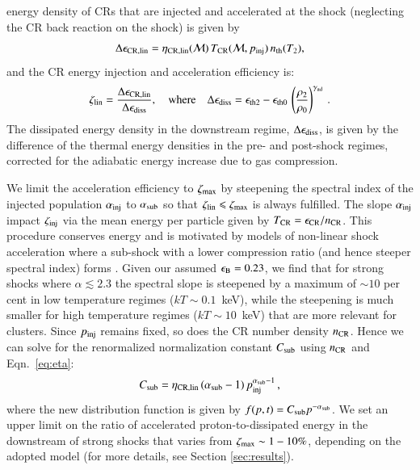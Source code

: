 \documentclass[fleqn,usenatbib,useAMS]{mnras}
\newcommand\eb{\epsilon_\rmn{B}}
\begin{document}
energy density of CRs that are injected and accelerated at the shock
(neglecting the CR back reaction on the shock) is given by
\begin{equation}
\label{eq:CR_energy} 
  \Delta\epsilon_{\mathrm{CR,lin}} =
  \eta_{\mathrm{CR,lin}}(\mathcal{M})\,T_{\mathrm{CR}}(\mathcal{M},p_{\mathrm{inj}})\,n_{\mathrm{th}}(T_2),
\end{equation}
and the CR energy injection and acceleration efficiency is:
\begin{equation}
  \zeta_{\mathrm{lin}} =
  \frac{\Delta\epsilon_{\mathrm{CR,lin}}}{\Delta\epsilon_{\mathrm{diss}}},
   \quad\mbox{where}\quad
  \Delta\epsilon_{\mathrm{diss}} = \epsilon_{\mathrm{th2}} - \epsilon_{\mathrm{th0}}\,\left(\frac{\rho_2}{\rho_0}\right)^{\gamma_{\mathrm{ad}}}\,.
\label{eqn:energy_frac}  
\end{equation}
The dissipated energy density in the downstream regime,
$\Delta\epsilon_{\mathrm{diss}}$, is given by the difference of the thermal
energy densities in the pre- and post-shock regimes, corrected for the
adiabatic energy increase due to gas compression.

We limit the acceleration efficiency to $\zeta_{\mathrm{max}}$ by
steepening the spectral index of the injected population
$\alpha_{\mathrm{inj}}$ to $\alpha_{\mathrm{sub}}$ so that $\zeta_{\mathrm{lin}}
\leqslant \zeta_{\mathrm{max}}$ is always fulfilled. The slope
$\alpha_{\mathrm{inj}}$ impact $\zeta_{\mathrm{inj}}$ via the mean energy per
particle given by $T_{\mathrm{CR}} = \epsilon_{\mathrm{CR}}/n_{\mathrm{CR}}$. This
procedure conserves energy and is motivated by models of non-linear
shock acceleration where a sub-shock with a lower compression ratio
(and hence steeper spectral index) forms
\citep[e.g.,][]{2000ApJ...540..292E}. Given our assumed $\eb=0.23$, we
find that for strong shocks where $\alpha \lesssim 2.3$ the spectral
slope is steepened by a maximum of $\sim 10$ per cent in low
temperature regimes ($kT\sim 0.1$~keV), while the steepening is much
smaller for high temperature regimes ($kT\sim 10$~keV) that are more
relevant for clusters. Since $p_{\mathrm{inj}}$ remains fixed, so does the
CR number density $n_{\mathrm{CR}}$. Hence we can solve for the
renormalized normalization constant $C_{\mathrm{sub}}$ using $n_{\mathrm{CR}}$
and Eqn.~\ref{eq:eta}:
\begin{equation}
  \label{eq:Cp_sub}
  C_{\mathrm{sub}}=\eta_{\mathrm{CR,lin}}\,(\alpha_{\mathrm{sub}}-1)\,p_{\mathrm{inj}}^{\alpha_{\mathrm{sub}}-1}\,,
\end{equation}
where the new distribution function is given by $f(p,t)= C_{\mathrm{sub}}
p^{-\alpha_{\mathrm{sub}}}$. We set an upper limit on the ratio of
accelerated proton-to-dissipated energy in the downstream of strong
shocks that varies from $\zeta_{\mathrm{max}} \sim 1-10\%$, depending on
the adopted model (for more details, see Section \ref{sec:results}).
\end{document}
